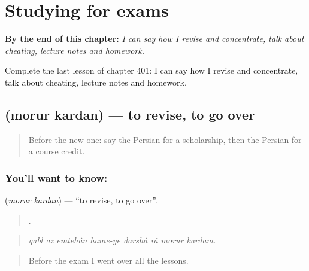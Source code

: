 
\chapter{Studying for exams}
\label{ch:fa-studying-for-exams}

\begin{chapteropening}
\textbf{By the end of this chapter:} \emph{I can say how I revise and concentrate, talk about cheating, lecture notes and homework.}

Complete the last lesson of chapter 401: I can say how I revise and concentrate, talk about cheating, lecture notes and homework.
\end{chapteropening}

\section[\texorpdfstring{\fa{مرور} \fa{کردن} (morur kardan)}{مرور کردن (morur kardan)}]{  (morur kardan) — to revise, to go over}

\label{lesson:FA-C401-morur-kardan}



\begin{quote}
Before the new one: say the Persian for a scholarship, then the Persian for a course credit.
\end{quote}

\subsection*{You'll want to know:  }
\textbf{ } (\emph{morur kardan}) — \textquotedblleft{}to revise, to go over\textquotedblright{}.

\begin{quote}
       .
\end{quote}

\begin{quote}
\emph{qabl az emtehân hame-ye darshâ râ morur kardam.}
\end{quote}

\begin{quote}
Before the exam I went over all the lessons.
\end{quote}

